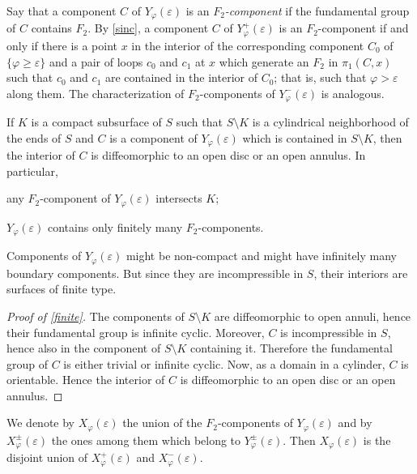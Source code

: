 Say that a component $C$ of $Y_{\varphi}({\varepsilon})$ is an \emph{$F_2$-component}
if the fundamental group of $C$ contains $F_2$.
By \cref{sinc}, a component $C$ of $Y_{\varphi}^+({\varepsilon})$ is an $F_2$-component
if and only if there is a point $x$ in the interior of the corresponding component $C_0$
of $\{{\varphi}\ge{\varepsilon}\}$ and a pair of loops $c_0$ and $c_1$ at $x$
which generate an $F_2$ in $\pi_1(C,x)$
such that $c_0$ and $c_1$ are contained in the interior of $C_0$;
that is, such that ${\varphi}>{\varepsilon}$ along them.
The characterization of $F_2$-components of $Y_{\varphi}^-({\varepsilon})$ is analogous.

\begin{lem}\label{finite}
If $K$ is a compact subsurface of $S$ such that $S\setminus K$ is a cylindrical
neighborhood of the ends of $S$ and $C$ is a component of $Y_{\varphi}({\varepsilon})$
which is contained in $S\setminus K$,
then the interior of $C$ is diffeomorphic to an open disc or an open annulus.
In particular,
\begin{compactenum}[1)]
\item
any $F_2$-component of $Y_{\varphi}({\varepsilon})$ intersects $K$;
\item
$Y_{\varphi}({\varepsilon})$ contains only finitely many $F_2$-components.
\end{compactenum}
\end{lem}

Components of $Y_{\varphi}({\varepsilon})$ might be non-compact
and might have infinitely many boundary components.
But since they are incompressible in $S$, their interiors are surfaces of finite type.

\begin{proof}[Proof of \cref{finite}]
The components of $S\setminus K$ are diffeomorphic to open annuli,
hence their fundamental group is infinite cyclic.
Moreover, $C$ is incompressible in $S$,
hence also in the component of $S\setminus K$ containing it.
Therefore the fundamental group of $C$ is either trivial or infinite cyclic.
Now, as a domain in a cylinder, $C$ is orientable.
Hence the interior of $C$ is diffeomorphic to an open disc or an open annulus.
\end{proof}

We denote by $X_{\varphi}({\varepsilon})$ the union of the $F_2$-components of $Y_{\varphi}({\varepsilon})$
and by $X_{\varphi}^\pm({\varepsilon})$ the ones among them which belong to $Y_{\varphi}^\pm({\varepsilon})$.
Then $X_{\varphi}({\varepsilon})$ is the disjoint union of $X_{\varphi}^+({\varepsilon})$ and $X_{\varphi}^-({\varepsilon})$.

